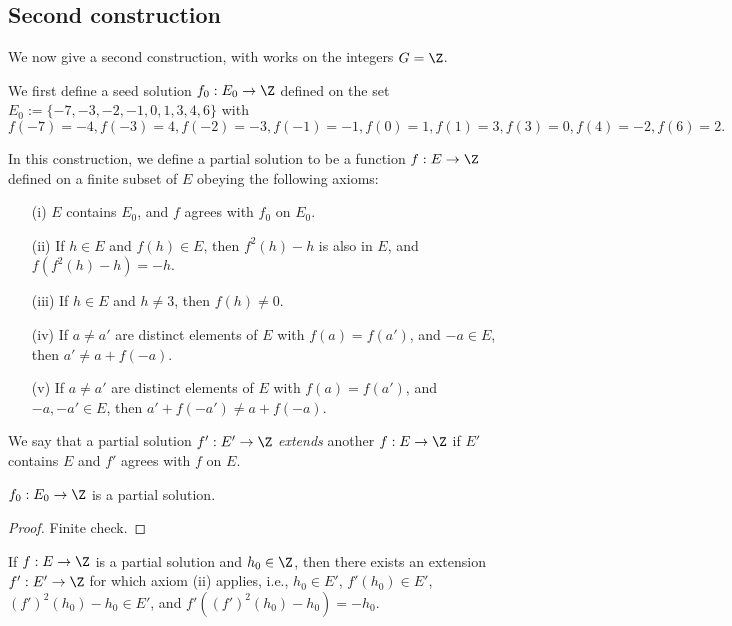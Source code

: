 \subsection{Second construction}

We now give a second construction, with works on the integers $G = \Z$.

We first define a seed solution $f_0: E_0 \to \Z$ defined on the set $E_0 := \{-7, -3, -2, -1, 0, 1, 3, 4, 6 \}$ with
$$ f(-7)=-4, f(-3) = 4, f(-2)=-3, f(-1)=-1, f(0) = 1, f(1) = 3, f(3)=0, f(4) = -2, f(6) = 2.$$

In this construction, we define a partial solution to be a function $f: E \to \Z$ defined on a finite subset of $E$ obeying the following axioms:
\begin{itemize}
\item[(i)] $E$ contains $E_0$, and $f$ agrees with $f_0$ on $E_0$.
\item[(ii)] If $h \in E$ and $f(h) \in E$, then $f^2(h)-h$ is also in $E$, and $f(f^2(h)-h) = -h$.
\item[(iii)] If $h \in E$ and $h \neq 3$, then $f(h) \neq 0$.
\item[(iv)]  If $a \neq a'$ are distinct elements of $E$ with $f(a)=f(a')$, and $-a \in E$, then $a' \neq a + f(-a)$.
\item[(v)]  If $a \neq a'$ are distinct elements of $E$ with $f(a)=f(a')$, and $-a, -a' \in E$, then $a' + f(-a') \neq a + f(-a)$.
\end{itemize}
We say that a partial solution $f': E' \to \Z$ \emph{extends} another $f: E \to \Z$ if $E'$ contains $E$ and $f'$ agrees with $f$ on $E$.

\begin{lemma}\label{finite-check} $f_0: E_0 \to \Z$ is a partial solution.
\end{lemma}

\begin{proof} Finite check.
\end{proof}

\begin{lemma}[Extension]\label{extension-lemma} If $f: E \to \Z$ is a partial solution and $h_0 \in \Z$, then there exists an extension $f': E' \to \Z$ for which axiom (ii) applies, i.e., $h_0 \in E'$, $f'(h_0) \in E'$, $(f')^2(h_0)-h_0 \in E'$, and $f'((f')^2(h_0)-h_0) = -h_0$.
\end{lemma}

